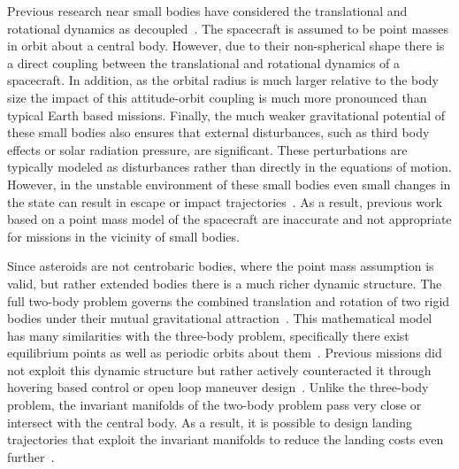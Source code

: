 \documentclass[11pt,draft]{article} %
\begin{document}
Previous research near small bodies have considered the translational and rotational dynamics as decoupled~\cite{broschart2005,scheeres1994}.
The spacecraft is assumed to be point masses in orbit about a central body.
However, due to their non-spherical shape there is a direct coupling between the translational and rotational dynamics of a spacecraft.
In addition, as the orbital radius is much larger relative to the body size the impact of this attitude-orbit coupling is much more pronounced than typical Earth based missions. 
Finally, the much weaker gravitational potential of these small bodies also ensures that external disturbances, such as third body effects or solar radiation pressure, are significant.
These perturbations are typically modeled as disturbances rather than directly in the equations of motion. 
However, in the unstable environment of these small bodies even small changes in the state can result in escape or impact trajectories~\cite{scheeres2012}.
As a result, previous work based on a point mass model of the spacecraft are inaccurate and not appropriate for missions in the vicinity of small bodies. 

Since asteroids are not centrobaric bodies, where the point mass assumption is valid, but rather extended bodies there is a much richer dynamic structure.
The full two-body problem governs the combined translation and rotation of two rigid bodies under their mutual gravitational attraction~\cite{fahnestock2006}. 
This mathematical model has many similarities with the three-body problem, specifically there exist equilibrium points as well as periodic orbits about them~\cite{scheeres1994,koon2000}.
Previous missions did not exploit this dynamic structure but rather actively counteracted it through hovering based control or open loop maneuver design~\cite{broschart2005,antreasian2002}.
Unlike the three-body problem, the invariant manifolds of the two-body problem pass very close or intersect with the central body. 
As a result, it is possible to design landing trajectories that exploit the invariant manifolds to reduce the landing costs even further~\cite{herrera2014}.  

\end{document}
